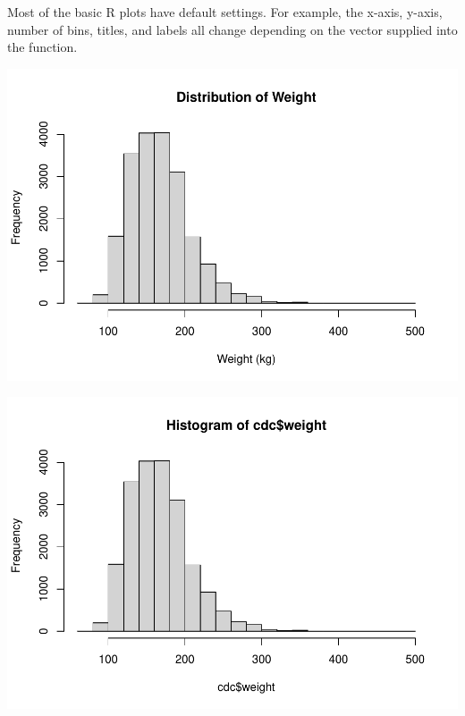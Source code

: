 \documentclass[
]{book}
\newenvironment{Shaded}{\begin{snugshade}}{\end{snugshade}}
\newcommand{\CommentTok}[1]{\textcolor[rgb]{0.56,0.35,0.01}{\textit{#1}}}
\newcommand{\DataTypeTok}[1]{\textcolor[rgb]{0.13,0.29,0.53}{#1}}
\newcommand{\KeywordTok}[1]{\textcolor[rgb]{0.13,0.29,0.53}{\textbf{#1}}}
\newcommand{\NormalTok}[1]{#1}
\newcommand{\OperatorTok}[1]{\textcolor[rgb]{0.81,0.36,0.00}{\textbf{#1}}}
\newcommand{\StringTok}[1]{\textcolor[rgb]{0.31,0.60,0.02}{#1}}
\begin{document}
Most of the basic R plots have default settings. For example, the x-axis, y-axis, number of bins, titles, and labels all change depending on the vector supplied into the function.

\begin{Shaded}
\end{Shaded}

\includegraphics{_main_files/figure-latex/unnamed-chunk-169-1.pdf}

\begin{Shaded}
\end{Shaded}

\includegraphics{_main_files/figure-latex/unnamed-chunk-169-2.pdf}
\end{document}
